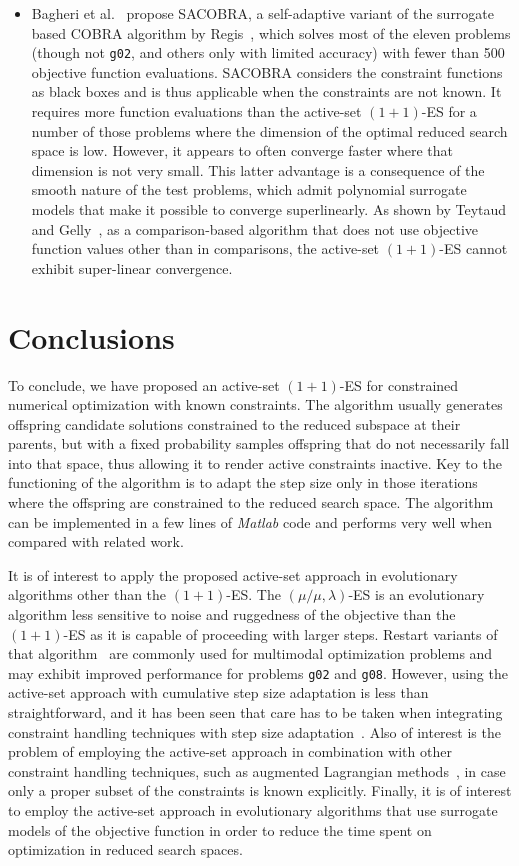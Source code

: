 \documentclass[oribibl]{llncs}
\begin{document}
\begin{itemize}
  \item Bagheri et al.~\cite{bagheri15} propose SACOBRA, a self-adaptive variant of the surrogate based COBRA algorithm by Regis~\cite{regis14}, which solves most of the eleven problems (though not \texttt{g02}, and others only with limited accuracy) with fewer than 500 objective function evaluations. SACOBRA considers the constraint functions as black boxes and is thus applicable when the constraints are not known. It requires more function evaluations than the active-set $(1+1)$-ES for a number of those problems where the dimension of the optimal reduced search space is low. However, it appears to often converge faster where that dimension is not very small. This latter advantage is a consequence of the smooth nature of the test problems, which admit polynomial surrogate models that make it possible to converge superlinearly. As shown by Teytaud and Gelly~\cite{TG06}, as a comparison-based algorithm that does not use objective function values other than in comparisons, the active-set $(1+1)$-ES cannot exhibit super-linear convergence.
\end{itemize}


\section{\label{sec4}Conclusions}

To conclude, we have proposed an active-set $(1+1)$-ES for constrained numerical optimization with known constraints. The algorithm usually generates offspring candidate solutions constrained to the reduced subspace at their parents, but with a fixed probability samples offspring that do not necessarily fall into that space, thus allowing it to render active constraints inactive. Key to the functioning of the algorithm is to adapt the step size only in those iterations where the offspring are constrained to the reduced search space. The algorithm can be implemented in a few lines of \textsl{Matlab} code and performs very well when compared with related work.

It is of interest to apply the proposed active-set approach in evolutionary algorithms other than the $(1+1)$-ES. The $(\mu/\mu,\lambda)$-ES is an evolutionary algorithm less sensitive to noise and ruggedness of the objective than the $(1+1)$-ES as it is capable of proceeding with larger steps. Restart variants of that algorithm~\cite{auger05} are commonly used for multimodal optimization problems and may exhibit improved performance for problems \texttt{g02} and \texttt{g08}. However, using the active-set approach with cumulative step size adaptation is less than straightforward, and it has been seen that care has to be taken when integrating constraint handling techniques with step size adaptation~\cite{arnold13a,hellwig16}. Also of interest is the problem of employing the active-set approach in combination with other constraint handling techniques, such as augmented Lagrangian methods~\cite{arnold15a}, in case only a proper subset of the constraints is known explicitly. Finally, it is of interest to employ the active-set approach in evolutionary algorithms that use surrogate models of the objective function in order to reduce the time spent on optimization in reduced search spaces.
\end{document}

